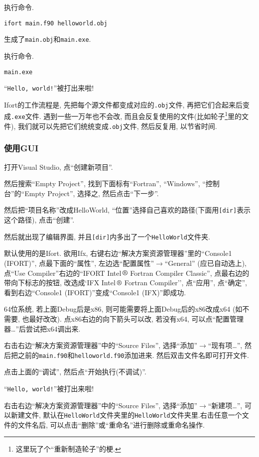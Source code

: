 执行命令.
\begin{lstlisting}
ifort main.f90 helloworld.obj
\end{lstlisting}
生成了\texttt{main.obj}和\texttt{main.exe}.

执行命令.
\begin{lstlisting}
main.exe
\end{lstlisting}
``\texttt{Hello, world!}''被打出来啦!

Ifort的工作流程是, 先把每个源文件都变成对应的\texttt{.obj}文件, 再把它们合起来后变成\texttt{.exe}文件. 遇到一些一万年也不会改, 而且会反复使用的文件(比如轮子\footnote{
    这里玩了个``重新制造轮子''的梗.
}里的文件), 我们就可以先把它们统统变成\texttt{.obj}文件, 然后反复用, 以节省时间.

\subsubsection{使用GUI}

打开Visual Studio, 点``创建新项目''.

然后搜索``Empty Project'', 找到下面标有``Fortran'', ``Windows'', ``控制台''的``Empty Project'', 选择之, 然后点击``下一步''.

然后把``项目名称''改成HelloWorld, ``位置''选择自己喜欢的路径(下面用\texttt{[dir]}表示这个路径), 点击``创建''.

然后就出现了编辑界面, 并且\texttt{[dir]}内多出了一个\texttt{HelloWorld}文件夹.

默认使用的是Ifort. 欲用Ifx, 右键右边``解决方案资源管理器''里的``Console1 (IFORT)'', 点最下面的``属性'', 左边选``配置属性''$\rightarrow$``General'' (应已自动选上), 点``Use Compiler''右边的``IFORT Intel$\,\text{\textregistered}$ Fortran Compiler Classic'', 点最右边的带向下标志的按钮, 改选成`IFX Intel$\,\text{\textregistered}$ Fortran Compiler'', 点``应用'', 点``确定'', 看到右边``Console1 (IFORT)''变成``Console1 (IFX)''即成功.

64位系统, 若上面Debug后是x86, 则可能需要将上面Debug后的x86改成x64 (如不需要, 也最好改改). 点x86右边的向下箭头可以改, 若没有x64, 可以点``配置管理器\dots''后尝试把x64调出来.

右击右边``解决方案资源管理器''中的``Source Files'', 选择``添加''$\rightarrow$``现有项\dots'', 然后把之前的\texttt{main.f90}和\texttt{helloworld.f90}添加进来. 然后双击文件名即可打开文件.

点击上面的``调试'', 然后点``开始执行(不调试)''.

``\texttt{Hello, world!}''被打出来啦!

右击右边``解决方案资源管理器''中的``Source Files'', 选择``添加''$\rightarrow$``新建项\dots'', 可以新建文件, 默认在\texttt{HelloWorld}文件夹里的\texttt{HelloWorld}文件夹里.右击任意一个文件的文件名后, 可以点击``删除''或``重命名''进行删除或重命名操作.

